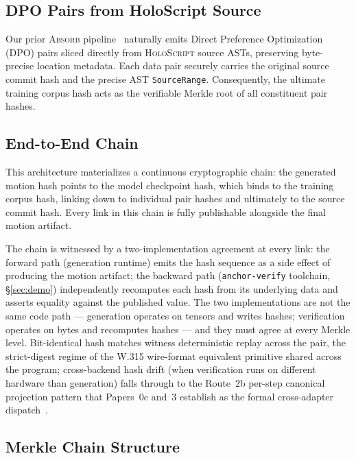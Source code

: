 \documentclass[sigconf,nonacm]{acmart}
\newcommand{\holoscript}{\textsc{HoloScript}}
\newcommand{\absorb}{\textsc{Absorb}}
\begin{document}
\subsection{DPO Pairs from HoloScript Source}
Our prior \absorb{} pipeline~\cite{absorb-b1-b2-2026} naturally emits Direct Preference Optimization (DPO) pairs sliced directly from \holoscript{} source ASTs, preserving byte-precise location metadata. Each data pair securely carries the original source commit hash and the precise AST \texttt{SourceRange}. Consequently, the ultimate training corpus hash acts as the verifiable Merkle root of all constituent pair hashes. %

\subsection{End-to-End Chain}
This architecture materializes a continuous cryptographic chain: the generated motion hash points to the model checkpoint hash, which binds to the training corpus hash, linking down to individual pair hashes and ultimately to the source commit hash. Every link in this chain is fully publishable alongside the final motion artifact. %

The chain is witnessed by a two-implementation agreement at every
link: the forward path (generation runtime) emits the hash sequence
as a side effect of producing the motion artifact; the backward path
(\texttt{anchor-verify} toolchain, \S\ref{sec:demo}) independently
recomputes each hash from its underlying data and asserts equality
against the published value. The two implementations are not the
same code path — generation operates on tensors and writes hashes;
verification operates on bytes and recomputes hashes — and they must
agree at every Merkle level. Bit-identical hash matches witness
deterministic replay across the pair, the strict-digest regime of
the W.315 wire-format equivalent primitive shared across the
program; cross-backend hash drift (when verification runs on
different hardware than generation) falls through to the Route~2b
per-step canonical projection pattern that Papers~0c and~3 establish
as the formal cross-adapter dispatch~\cite{paper-0c-twin-test-2026-05-11}.

\subsection{Merkle Chain Structure}
\label{sec:training:merkle}
\end{document}
